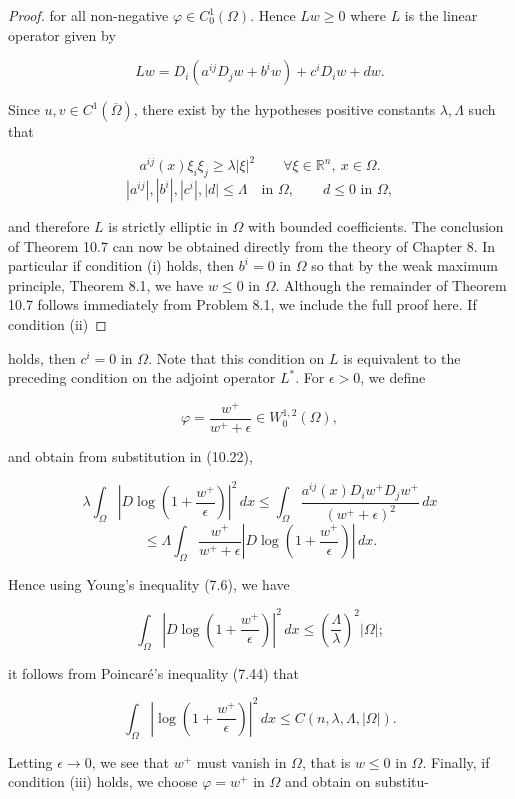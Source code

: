 \begin{theorem}
\begin{proof}
for all non-negative $\varphi\in C^1_0(\Omega)$. Hence $Lw\ge 0$ where $L$ is the linear operator given by

\[
Lw=D_i(a^{ij}D_jw+b^iw)+c^iD_iw+dw.
\]

Since $u,v\in C^1(\overline{\Omega})$, there exist by the hypotheses positive constants $\lambda,\Lambda$ such that

\[
a^{ij}(x)\xi_i\xi_j\ge \lambda |\xi|^2\qquad \forall \xi\in \mathbb R^n,\ x\in \Omega.
\]
\[
|a^{ij}|,|b^i|,|c^i|,|d|\le \Lambda \quad \text{in } \Omega,\qquad d\le 0 \text{ in } \Omega,
\]

and therefore $L$ is strictly elliptic in $\Omega$ with bounded coefficients. The conclusion of Theorem 10.7 can now be obtained directly from the theory of Chapter 8. In particular if condition (i) holds, then $b^i=0$ in $\Omega$ so that by the weak maximum principle, Theorem 8.1, we have $w\le 0$ in $\Omega$. Although the remainder of Theorem 10.7 follows immediately from Problem 8.1, we include the full proof here. If condition (ii)
\end{proof}
\end{theorem}


holds, then $c^i = 0$ in $\Omega$. Note that this condition on $L$ is equivalent to the preceding
condition on the adjoint operator $L^*$. For $\epsilon > 0$, we define

\[
\varphi = \frac{w^+}{w^+ + \epsilon} \in W^{1,2}_0(\Omega),
\]

and obtain from substitution in (10.22),

\[
\lambda \int_{\Omega} \left|D \log \left(1 + \frac{w^+}{\epsilon}\right)\right|^2\,dx
\le \int_{\Omega} \frac{a^{ij}(x)D_i w^+ D_j w^+}{(w^+ + \epsilon)^2}\,dx
\]
\[
\le \Lambda \int_{\Omega} \frac{w^+}{w^+ + \epsilon}\left|D \log \left(1 + \frac{w^+}{\epsilon}\right)\right|\,dx.
\]

Hence using Young's inequality (7.6), we have

\[
\int_{\Omega} \left|D \log \left(1 + \frac{w^+}{\epsilon}\right)\right|^2\,dx
\le \left(\frac{\Lambda}{\lambda}\right)^2 |\Omega|;
\]

it follows from Poincar\'e's inequality (7.44) that

\[
\int_{\Omega} \left|\log \left(1 + \frac{w^+}{\epsilon}\right)\right|^2\,dx
\le C(n,\lambda,\Lambda,|\Omega|).
\]

Letting $\epsilon \to 0$, we see that $w^+$ must vanish in $\Omega$, that is $w \le 0$ in $\Omega$.
Finally, if condition (iii) holds, we choose $\varphi = w^+$ in $\Omega$ and obtain on substitu-

